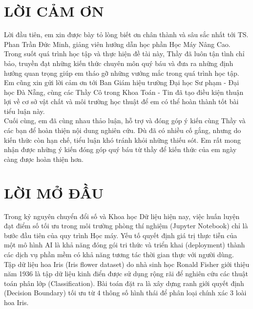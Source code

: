 \documentclass[14pt]{extarticle}
\begin{document}
	\section*{LỜI CẢM ƠN}
	
	
	\noindent Lời đầu tiên, em xin được bày tỏ lòng biết ơn chân thành và sâu sắc nhất tới TS. Phan Trần Đức Minh, giảng viên hướng dẫn học phần Học Máy Nâng Cao. Trong suốt quá trình học tập và thực hiện đề tài này, Thầy đã luôn tận tình chỉ bảo, truyền đạt những kiến thức chuyên môn quý báu và đưa ra những định hướng quan trọng giúp em tháo gỡ những vướng mắc trong quá trình học tập.\\
	
	\noindent Em cũng xin gửi lời cảm ơn tới Ban Giám hiệu trường Đại học Sư phạm - Đại học Đà Nẵng, cùng các Thầy Cô trong Khoa Toán - Tin đã tạo điều kiện thuận lợi về cơ sở vật chất và môi trường học thuật để em có thể hoàn thành tốt bài tiểu luận này.\\
	
	\noindent Cuối cùng, em đã cùng nhau thảo luận, hỗ trợ và đóng góp ý kiến cùng Thầy và các bạn để hoàn thiện nội dung nghiên cứu. Dù đã có nhiều cố gắng, nhưng do kiến thức còn hạn chế, tiểu luận khó tránh khỏi những thiếu sót. Em rất mong nhận được những ý kiến đóng góp quý báu từ thầy để kiến thức của em ngày càng được hoàn thiện hơn.
	
	\newpage
	\section*{LỜI MỞ ĐẦU}
	\vspace{1.em}
	
	Trong kỷ nguyên chuyển đổi số và Khoa học Dữ liệu hiện nay, việc huấn luyện đạt điểm số tối ưu trong môi trường phòng thí nghiệm (Jupyter Notebook) chỉ là bước đầu tiên của quy trình Học máy. Yếu tố quyết định giá trị thực tiễn của một mô hình AI là khả năng đóng gói tri thức và triển khai (deployment) thành các dịch vụ phần mềm có khả năng tương tác thời gian thực với người dùng.\\  
	
	\noindent Tập dữ liệu hoa Iris (Iris flower dataset) do nhà sinh học Ronald Fisher giới thiệu năm 1936 là tập dữ liệu kinh điển được sử dụng rộng rãi để nghiên cứu các thuật toán phân lớp (Classification). Bài toán đặt ra là xây dựng ranh giới quyết định (Decision Boundary) tối ưu từ 4 thông số hình thái để phân loại chính xác 3 loài hoa Iris.\\
	
\end{document}
